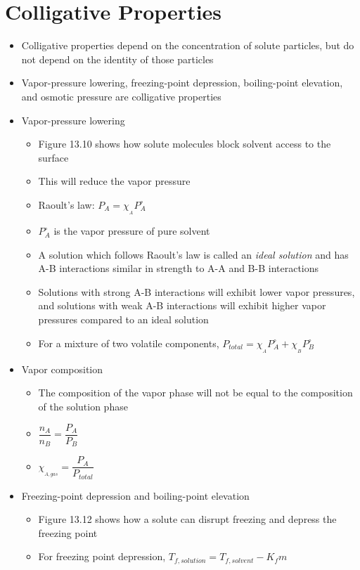 \documentclass[12pt, openany, letterpaper]{memoir}
\begin{document}
\section{Colligative Properties}
\begin{itemize}
	\item Colligative properties depend on the concentration of solute particles, but do not depend on the identity of those particles
	\item Vapor-pressure lowering, freezing-point depression, boiling-point elevation, and osmotic pressure are colligative properties
	\item Vapor-pressure lowering
	\begin{itemize}
		\item Figure 13.10 shows how solute molecules block solvent access to the surface
		\item This will reduce the vapor pressure
		\item Raoult's law: $P_A=\chi_{_A}P^\circ_A$
		\item $P^\circ_A$ is the vapor pressure of pure solvent 
		\item A solution which follows Raoult's law is called an \emph{ideal solution} and has A-B interactions similar in strength to A-A and B-B interactions
		\item Solutions with strong A-B interactions will exhibit lower vapor pressures, and solutions with weak A-B interactions will exhibit higher vapor pressures compared to an ideal solution
		\item For a mixture of two volatile components, $P_{total} = \chi_{_A}P^\circ_A + \chi_{_B}P^\circ_B$
	\end{itemize}
	\item Vapor composition
	\begin{itemize}
		\item The composition of the vapor phase will not be equal to the composition of the solution phase
		\item $\dfrac{n_A}{n_B} = \dfrac{P_A}{P_B}$
		\item $\chi_{_{A,gas}}=\dfrac{P_A}{P_{total}}$
	\end{itemize}
	\item Freezing-point depression and boiling-point elevation
	\begin{itemize}
		\item Figure 13.12 shows how a solute can disrupt freezing and depress the freezing point
		\item For freezing point depression, $T_{f,solution}=T_{f,solvent}-K_fm$

\end{itemize}
\end{itemize}
\end{document}
